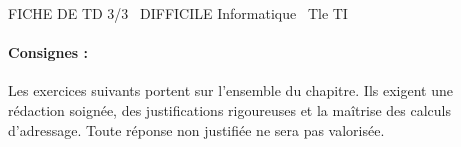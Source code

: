 \documentclass[11pt]{article}
\begin{document}
\begin{tcolorbox}[enhanced,colback=popink,colframe=popink,arc=10pt,boxrule=0pt,left=12pt,right=12pt,top=9pt,bottom=9pt]
{\color{white}\popxbold\small FICHE DE TD 3/3 \textbullet\ DIFFICILE \hfill Informatique \textbullet\ Tle TI\par}
\end{tcolorbox}
\vspace{4pt}
\paragraph{Consignes :} Les exercices suivants portent sur l'ensemble du chapitre. Ils exigent une rédaction soignée, des justifications rigoureuses et la maîtrise des calculs d'adressage. Toute réponse non justifiée ne sera pas valorisée.
\end{document}
